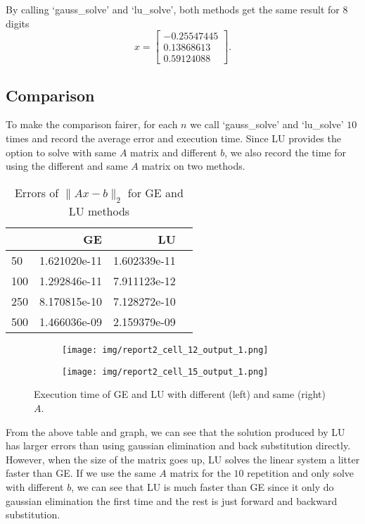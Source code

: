 \documentclass[a4paper,12pt]{article}
\begin{document}
By calling `gauss\_solve' and `lu\_solve',
both methods get the same result for 8 digits
$$
x = \begin{bmatrix}
	-0.25547445  \\
	0.13868613  \\
	0.59124088
\end{bmatrix}.
$$

\subsection{Comparison}
To make the comparison fairer,
for each $n$ we call `gauss\_solve' and `lu\_solve' $10$ times
and record the average error and execution time.
Since LU provides the option to solve with same $A$ matrix and different $b$,
we also record the time for using the different and same $A$ matrix on two methods.

\begin{table}[H]
\begin{center}
	\begin{tabular}{lrrr}
	\toprule
	{}  &            GE &            LU \\
	\midrule
	 50 &  1.621020e-11 &  1.602339e-11 \\
	100 &  1.292846e-11 &  7.911123e-12 \\
	250 &  8.170815e-10 &  7.128272e-10 \\
	500 &  1.466036e-09 &  2.159379e-09 \\
	\bottomrule
	\end{tabular}
	\caption{Errors of $\| Ax - b\|_{2}$ for GE and LU methods}
\end{center}
\end{table}


\begin{figure}[H]
    \centering
	\begin{subfigure}[b]{0.49\textwidth}
	    \centering
	    \texttt{[image: img/report2\_cell\_12\_output\_1.png]}
	    \label{fig:0}
	\end{subfigure}
	\hfill
	\begin{subfigure}[b]{0.49\textwidth}
	    \centering
	     \texttt{[image: img/report2\_cell\_15\_output\_1.png]}
	     \label{fig:1}
	\end{subfigure}
	\caption{Execution time of GE and LU with different (left) and same (right) $A$.}
\end{figure}



From the above table and graph, we can see that the solution produced by LU
has larger errors than using gaussian elimination and back substitution directly.
However, when the size of the matrix goes up, LU solves the linear system a litter faster than GE.
If we use the same $A$ matrix for the $10$ repetition and only solve with different $b$,
we can see that LU is much faster than GE
since it only do gaussian elimination the first time and the rest is just forward and backward substitution.
\end{document}
